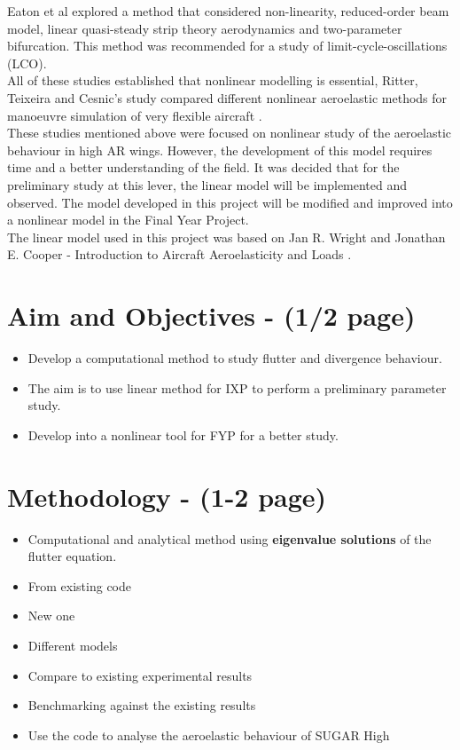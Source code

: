 \documentclass[11pt]{article}
\begin{document}
Eaton et al \cite{EatonNumericalWings} explored a method that considered non-linearity, reduced-order beam model, linear quasi-steady strip theory aerodynamics and two-parameter bifurcation. This method was recommended for a study of limit-cycle-oscillations (LCO).\\

All of these studies established that nonlinear modelling is essential, Ritter, Teixeira and Cesnic's study compared different nonlinear aeroelastic methods for manoeuvre simulation of very flexible aircraft \cite{Ritter2018ComparisonAircraft}.\\

These studies mentioned above were focused on nonlinear study of the aeroelastic behaviour in high AR wings. However, the development of this model requires time and a better understanding of the field. It was decided that for the preliminary study at this lever, the linear model will be implemented and observed. The model developed in this project will be modified and improved into a nonlinear model in the Final Year Project.\\

The linear model used in this project was based on Jan R. Wright and Jonathan E. Cooper - Introduction to Aircraft Aeroelasticity and Loads \cite{Wright2015INTRODUCTIONLOADS}. 


\section{Aim and Objectives - (1/2 page)}
\begin{itemize}
    \item Develop a computational method to study flutter and divergence behaviour.
    \item The aim is to use linear method for IXP to perform a preliminary parameter study.
    \item Develop into a nonlinear tool for FYP for a better study.
\end{itemize}

\section{Methodology - (1-2 page)}
\begin{itemize}
    \item Computational and analytical method using \textbf{eigenvalue solutions} of the flutter equation.
    \item From existing code
    \item New one
    \item Different models
    \item Compare to existing experimental results
    \item Benchmarking against the existing results
    \item Use the code to analyse the aeroelastic behaviour of SUGAR High
\end{itemize}
\end{document}
